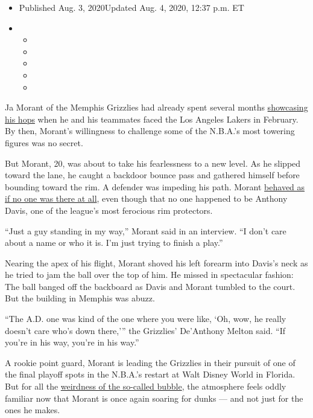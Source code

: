 \begin{itemize}
\item
  Published Aug. 3, 2020Updated Aug. 4, 2020, 12:37 p.m. ET
\item
  \begin{itemize}
  \item
  \item
  \item
  \item
  \item
  \end{itemize}
\end{itemize}

Ja Morant of the Memphis Grizzlies had already spent several months
\href{https://www.nytimes.com/2019/11/02/sports/basketball/ja-morant-memphis-grizzlies.html}{showcasing
his hops} when he and his teammates faced the Los Angeles Lakers in
February. By then, Morant's willingness to challenge some of the
N.B.A.'s most towering figures was no secret.

But Morant, 20, was about to take his fearlessness to a new level. As he
slipped toward the lane, he caught a backdoor bounce pass and gathered
himself before bounding toward the rim. A defender was impeding his
path. Morant \href{https://www.youtube.com/watch?v=de0nkHhxGKI}{behaved
as if no one was there at all}, even though that no one happened to be
Anthony Davis, one of the league's most ferocious rim protectors.

``Just a guy standing in my way,'' Morant said in an interview. ``I
don't care about a name or who it is. I'm just trying to finish a
play.''

Nearing the apex of his flight, Morant shoved his left forearm into
Davis's neck as he tried to jam the ball over the top of him. He missed
in spectacular fashion: The ball banged off the backboard as Davis and
Morant tumbled to the court. But the building in Memphis was abuzz.

``The A.D. one was kind of the one where you were like, `Oh, wow, he
really doesn't care who's down there,''' the Grizzlies' De'Anthony
Melton said. ``If you're in his way, you're in his way.''

A rookie point guard, Morant is leading the Grizzlies in their pursuit
of one of the final playoff spots in the N.B.A.'s restart at Walt Disney
World in Florida. But for all the
\href{https://www.nytimes.com/2020/07/27/sports/basketball/coronavirus-nba-season-bubble-disney-world.html}{weirdness
of the so-called bubble}, the atmosphere feels oddly familiar now that
Morant is once again soaring for dunks --- and not just for the ones he
makes.

